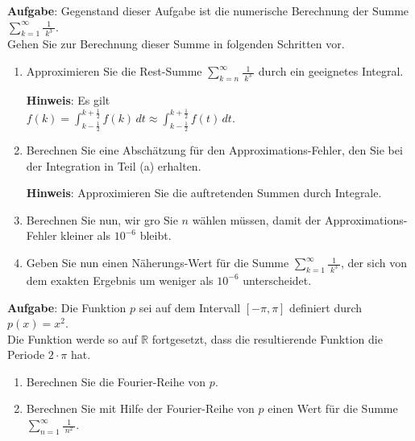 \documentclass{article}
\newcommand{\bruch}[2]{\displaystyle\frac{\;\displaystyle#1\;}{\;\displaystyle#2\;}}
\begin{document}
\noindent
\textbf{Aufgabe}: Gegenstand dieser Aufgabe ist die numerische Berechnung der Summe 
\\[0.1cm]
\hspace*{1.3cm} $\displaystyle \sum\limits_{k=1}^\infty \bruch{1}{k^3}$.
\\[0.1cm]
Gehen Sie zur Berechnung dieser Summe in folgenden Schritten vor.
\begin{enumerate}
\item Approximieren Sie die Rest-Summe $\sum\limits_{k=n}^\infty \bruch{1}{k^3}$ 
      durch ein geeignetes Integral.

      \textbf{Hinweis}: Es gilt 
      \\[0.1cm]
      \hspace*{1.3cm} $\displaystyle f(k) = \int_{k-\frac{1}{2}}^{k+\frac{1}{2}} f(k) \, dt \approx \int_{k-\frac{1}{2}}^{k+\frac{1}{2}} f(t) \, dt$.
\item Berechnen Sie eine Absch\"atzung f\"ur den Approximations-Fehler,
      den Sie bei der Integration in Teil (a) erhalten.
      
      \textbf{Hinweis}: Approximieren Sie die auftretenden Summen durch Integrale.
\item Berechnen Sie nun, wir gro\3 Sie $n$ w\"ahlen m\"ussen, damit der Approximations-Fehler
      kleiner als $10^{-6}$ bleibt.
\item Geben Sie nun einen N\"aherungs-Wert f\"ur die Summe $\sum\limits_{k=1}^\infty \bruch{1}{k^3}$,
      der sich von dem exakten Ergebnis um weniger als $10^{-6}$ unterscheidet.
\end{enumerate}
\vspace*{0.3cm} 

\noindent
\textbf{Aufgabe}:
Die Funktion $p$ sei auf dem Intervall $[-\pi,\pi]$ definiert durch
\\[0.1cm]
\hspace*{1.3cm}
$p(x) = x^2$.
\\[0.1cm]
Die Funktion werde so auf $\mathbb{R}$ fortgesetzt, dass die resultierende Funktion die Periode
$2\!\cdot\!\pi$ hat.  
\begin{enumerate}
\item Berechnen Sie die Fourier-Reihe von $p$.
\item Berechnen Sie mit Hilfe der Fourier-Reihe von $p$ einen Wert f\"ur die Summe
      \\[0.1cm]
      \hspace*{1.3cm}
      $\displaystyle \sum\limits_{n=1}^\infty \bruch{1}{n^2}$. 
\end{enumerate}
\end{document}
